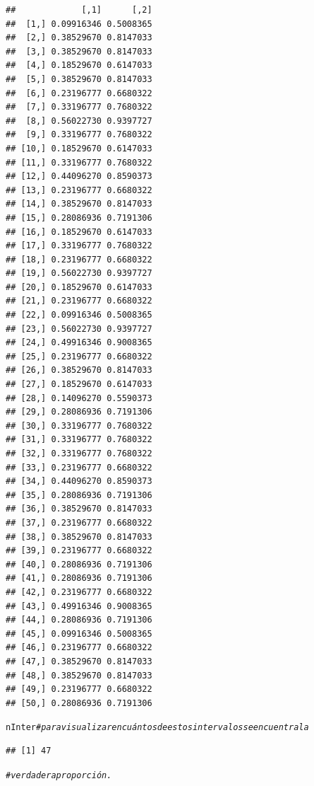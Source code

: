 \documentclass[12pt,letterpaper]{article}\usepackage[]{graphicx}\usepackage[]{color}
\makeatletter
\newcommand{\hlcom}[1]{\textcolor[rgb]{0.678,0.584,0.686}{\textit{#1}}}%
\newcommand{\hlstd}[1]{\textcolor[rgb]{0.345,0.345,0.345}{#1}}%
\newenvironment{kframe}{%
 \def\at@end@of@kframe{}%
 \ifinner\ifhmode%
  \def\at@end@of@kframe{\end{minipage}}%
  \begin{minipage}{\columnwidth}%
 \fi\fi%
 \def\FrameCommand##1{\hskip\@totalleftmargin \hskip-\fboxsep
 \colorbox{shadecolor}{##1}\hskip-\fboxsep
     \hskip-\linewidth \hskip-\@totalleftmargin \hskip\columnwidth}%
 \MakeFramed {\advance\hsize-\width
   \@totalleftmargin\z@ \linewidth\hsize
   \@setminipage}}%
 {\par\unskip\endMakeFramed%
 \at@end@of@kframe}
\newenvironment{knitrout}{}{} %
\makeatother
\begin{document}
\begin{knitrout}
\begin{kframe}
\begin{alltt}
\end{alltt}
\begin{verbatim}
##             [,1]      [,2]
##  [1,] 0.09916346 0.5008365
##  [2,] 0.38529670 0.8147033
##  [3,] 0.38529670 0.8147033
##  [4,] 0.18529670 0.6147033
##  [5,] 0.38529670 0.8147033
##  [6,] 0.23196777 0.6680322
##  [7,] 0.33196777 0.7680322
##  [8,] 0.56022730 0.9397727
##  [9,] 0.33196777 0.7680322
## [10,] 0.18529670 0.6147033
## [11,] 0.33196777 0.7680322
## [12,] 0.44096270 0.8590373
## [13,] 0.23196777 0.6680322
## [14,] 0.38529670 0.8147033
## [15,] 0.28086936 0.7191306
## [16,] 0.18529670 0.6147033
## [17,] 0.33196777 0.7680322
## [18,] 0.23196777 0.6680322
## [19,] 0.56022730 0.9397727
## [20,] 0.18529670 0.6147033
## [21,] 0.23196777 0.6680322
## [22,] 0.09916346 0.5008365
## [23,] 0.56022730 0.9397727
## [24,] 0.49916346 0.9008365
## [25,] 0.23196777 0.6680322
## [26,] 0.38529670 0.8147033
## [27,] 0.18529670 0.6147033
## [28,] 0.14096270 0.5590373
## [29,] 0.28086936 0.7191306
## [30,] 0.33196777 0.7680322
## [31,] 0.33196777 0.7680322
## [32,] 0.33196777 0.7680322
## [33,] 0.23196777 0.6680322
## [34,] 0.44096270 0.8590373
## [35,] 0.28086936 0.7191306
## [36,] 0.38529670 0.8147033
## [37,] 0.23196777 0.6680322
## [38,] 0.38529670 0.8147033
## [39,] 0.23196777 0.6680322
## [40,] 0.28086936 0.7191306
## [41,] 0.28086936 0.7191306
## [42,] 0.23196777 0.6680322
## [43,] 0.49916346 0.9008365
## [44,] 0.28086936 0.7191306
## [45,] 0.09916346 0.5008365
## [46,] 0.23196777 0.6680322
## [47,] 0.38529670 0.8147033
## [48,] 0.38529670 0.8147033
## [49,] 0.23196777 0.6680322
## [50,] 0.28086936 0.7191306
\end{verbatim}
\begin{alltt}
\hlstd{nInter} \hlcom{# para visualizar en cuántos de estos intervalos se encuentra la }
\end{alltt}
\begin{verbatim}
## [1] 47
\end{verbatim}
\begin{alltt}
\hlcom{# verdadera proporción.}
\end{alltt}
\end{kframe}
\end{knitrout}
\end{document}
